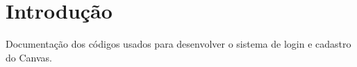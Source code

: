 \hypertarget{teste_intro_sec}{}\section{Introdução}\label{teste_intro_sec}
Documentação dos códigos usados para desenvolver o sistema de login e cadastro do Canvas. 